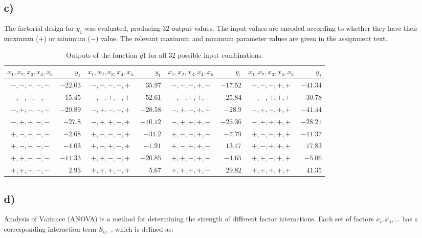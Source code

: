 \subsection*{c)}

The factorial design for $y_1$ was evaluated, producing $32$ output values. The input values are encoded according to whether they have their maximum ($+$) or minimum ($-$) value. The relevant maximum and minimum parameter values are given in the assignment text. \cite[p.4]{homework-w4}

\begin{table}[h!]
\centering
\begin{tabular}{cr|cr|cr|cr}
	$x_1, x_2, x_3, x_4, x_5$ & $y_1$ &$x_1, x_2, x_3, x_4, x_5$ & $y_1$ &$x_1, x_2, x_3, x_4, x_5$ & $y_1$ &$x_1, x_2, x_3, x_4, x_5$ & $y_1$ \\
	\hline
	$-,-,-,-,-$ & $-22.03$ & $-,-,-,-,+$ &  $35.97$ & $-,-,-,+,-$ & $-17.52$ & $-,-,-,+,+$ & $-41.34$ \\
	$-,-,+,-,-$ & $-15.45$ & $-,-,+,-,+$ & $-52.61$ & $-,-,+,+,-$ & $-25.84$ & $-,-,+,+,+$ & $-30.78$ \\
	$-,+,-,-,-$ & $-20.89$ & $-,+,-,-,+$ & $-28.58$ & $-,+,-,+,-$ &  $-28.9$ & $-,+,-,+,+$ & $-41.44$ \\
	$-,+,+,-,-$ &  $-27.8$ & $-,+,+,-,+$ & $-40.12$ & $-,+,+,+,-$ & $-25.36$ & $-,+,+,+,+$ & $-28.21$ \\
	$+,-,-,-,-$ &  $-2.68$ & $+,-,-,-,+$ &  $-31.2$ & $+,-,-,+,-$ &  $-7.79$ & $+,-,-,+,+$ & $-11.37$ \\
	$+,-,+,-,-$ &  $-4.03$ & $+,-,+,-,+$ &  $-1.91$ & $+,-,+,+,-$ &  $13.47$ & $+,-,+,+,+$ &  $17.83$ \\
	$+,+,-,-,-$ & $-11.33$ & $+,+,-,-,+$ & $-20.85$ & $+,+,-,+,-$ &  $-4.65$ & $+,+,-,+,+$ &  $-5.06$ \\
	$+,+,+,-,-$ &   $2.93$ & $+,+,+,-,+$ &   $5.67$ & $+,+,+,+,-$ &  $29.82$ & $+,+,+,+,+$ &  $41.35$ \\
\end{tabular}
\caption{Outputs of the function $y1$ for all 32 possible input combinations.}
\label{tab:outputs_y1}
\end{table}

\subsection*{d)}

Analysis of Variance (ANOVA) is a method for determining the strength of different factor interactions. Each set of factors $x_i, x_j, \dots$ has a corresponding interaction term $S_{ij\dots}$, which is defined as:


